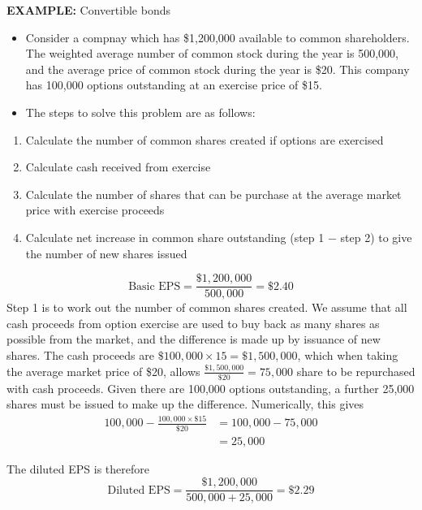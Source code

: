 \documentclass[../notes_compiled.tex]{subfiles}
\begin{document}
\begin{itemize}
{\color{RedViolet}
\item[] \textbf{EXAMPLE:} Convertible bonds
\begin{itemize}
\item[] Consider a compnay which has \$1,200,000 available to common shareholders. The weighted average number of common stock during the year is 500,000, and the average price of common stock during the year is \$20. This company has 100,000 options outstanding at an exercise price of \$15.
\end{itemize}
}
{\color{RoyalBlue}
\begin{itemize}
\item[] The steps to solve this problem are as follows:
\end{itemize}
\begin{enumerate}
\item Calculate the number of common shares created if options are exercised
\item Calculate cash received from exercise
\item Calculate the number of shares that can be purchase at the average market price with exercise proceeds
\item Calculate net increase in common share outstanding (step 1 $-$ step 2) to give the number of new shares issued
\end{enumerate}
\begin{equation*}
\text{Basic EPS} = \frac{\$1,200,000}{500,000} = \$2.40
\end{equation*}
Step 1 is to work out the number of common shares created. We assume that all cash proceeds from option exercise are used to buy back as many shares as possible from the market, and the difference is made up by issuance of new shares. The cash proceeds are $\$100,000 \times 15 = \$1,500,000$, which when taking the average market price of \$20, allows $\frac{\$1,500,000}{\$20} = 75,000$ share to be repurchased with cash proceeds. Given there are 100,000 options outstanding, a further 25,000 shares must be issued to make up the difference. Numerically, this gives
\begin{align*}
100,000 - \frac{100,000\times\$15}{\$20} &= 100,000 - 75,000 \\
&= 25,000
\end{align*}

The diluted EPS is therefore
\begin{equation*}
\text{Diluted EPS} = \frac{\$1,200,000}{500,000 + 25,000} = \$2.29
\end{equation*}
}

\end{itemize}
\end{document}
